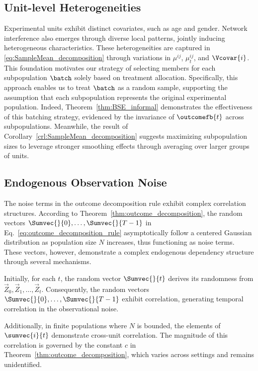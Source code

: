 \subsection{Unit-level Heterogeneities}
% 
Experimental units exhibit distinct covariates, such as age and gender. Network interference also emerges through diverse local patterns, jointly inducing heterogeneous characteristics. These heterogeneities are captured in \eqref{eq:SampleMean_decomposition} through variations in $\mu^{ij}$, $\mu_t^{ij}$, and $\Vcovar{i}$. This foundation motivates our strategy of selecting members for each subpopulation $\batch$ solely based on treatment allocation. Specifically, this approach enables us to treat $\batch$ as a random sample, supporting the assumption that each subpopulation represents the original experimental population. Indeed, Theorem~\ref{thm:BSE_informal} demonstrates the effectiveness of this batching strategy, evidenced by the invariance of $\outcomefb{t}$ across subpopulations. Meanwhile, the result of Corollary~\ref{crl:SampleMean_decomposition} suggests maximizing subpopulation sizes to leverage stronger smoothing effects through averaging over larger groups of units.


\subsection{Endogenous Observation Noise}
% 
The noise terms in the outcome decomposition rule exhibit complex correlation structures. According to Theorem~\ref{thm:outcome_decomposition}, the random vectors $\Sumvec{}{0}, \ldots, \Sumvec{}{T-1}$ in Eq.~\eqref{eq:outcome_decomposition_rule} asymptotically follow a centered Gaussian distribution as population size $N$ increases, thus functioning as noise terms. These vectors, however, demonstrate a complex endogenous dependency structure through several mechanisms.

Initially, for each $t$, the random vector $\Sumvec{}{t}$ derives its randomness from $\Vec{Z}_0, \Vec{Z}_1, \ldots, \Vec{Z}_{t}$. Consequently, the random vectors $\Sumvec{}{0}, \ldots, \Sumvec{}{T-1}$ exhibit correlation, generating temporal correlation in the observational noise.

Additionally, in finite populations where $N$ is bounded, the elements of $\sumvec{i}{t}$ demonstrate cross-unit correlation. The magnitude of this correlation is governed by the constant $c$ in Theorem~\ref{thm:outcome_decomposition}, which varies across settings and remains unidentified.

